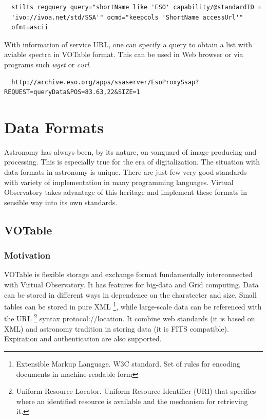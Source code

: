 \begin{lstlisting}
  stilts regquery query="shortName like 'ESO' capability/@standardID =
  'ivo://ivoa.net/std/SSA'" ocmd="keepcols 'ShortName accessUrl'"
  ofmt=ascii
\end{lstlisting}

With information of service URL, one can specify a query to obtain a
list with aviable spectra in VOTable format. This can be used in Web
browser or via programs such \emph{wget} or \emph{curl}.

\begin{lstlisting}
  http://archive.eso.org/apps/ssaserver/EsoProxySsap?REQUEST=queryData&POS=83.63,22&SIZE=1
\end{lstlisting}

\section{Data Formats}
Astronomy has always been, by its nature, on vanguard of image
producing and processing. This is especially true for the era of
digitalization. The situation with data formats in astronomy is
unique. There are just few very good standards with variety of
implementation in many programming languages. Virtual Observatory
takes advantage of this heritage and implement these formats in
sensible way into its own standards. 
 
\subsection{VOTable}
\subsubsection*{Motivation}
VOTable is flexible storage and exchange format fundamentally
interconnected with Virtual Observatory. It has features for big-data
and Grid computing. Data can be stored in different ways in dependence
on the charatecter and size. Small tables can be stored in pure XML
\footnote{Extensible Markup Language. W3C standard. Set of rules for
  encoding documents in machine-readable form}, while large-scale data
can be referenced with the URL \footnote{Uniform Resource
  Locator. Uniform Resource Identifier (URI) that specifies where an
  identified resource is available and the mechanism for retrieving
  it.} syntax protocol://location.  It combine web standards (it is
based on XML) and astronomy tradition in storing data (it is FITS
compatible). Expiration and authentication are also supported.

